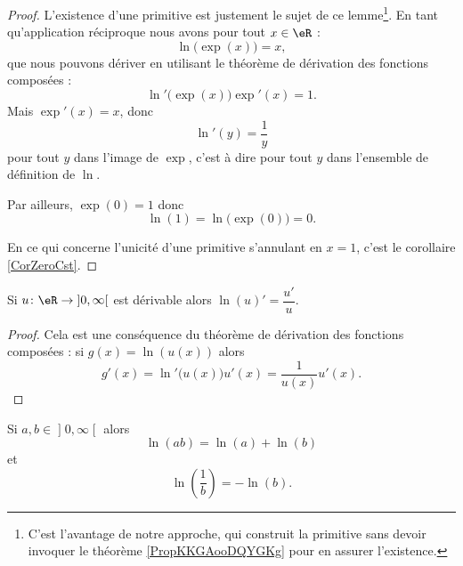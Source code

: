 \begin{proof}
    L'existence d'une primitive est justement le sujet de ce lemme\footnote{C'est l'avantage de notre approche, qui construit la primitive sans devoir invoquer le théorème \ref{PropKKGAooDQYGKg} pour en assurer l'existence.}. En tant qu'application réciproque nous avons pour tout \( x\in \eR\) :
    \begin{equation}
        \ln\big( \exp(x) \big)=x,
    \end{equation}
    que nous pouvons dériver en utilisant le théorème de dérivation des fonctions composées :
    \begin{equation}
        \ln'\big( \exp(x) \big)\exp'(x)=1.
    \end{equation}
    Mais \( \exp'(x)=x\), donc
    \begin{equation}
        \ln'(y)=\frac{1}{ y }
    \end{equation}
    pour tout \( y\) dans l'image de \( \exp\), c'est à dire pour tout \( y\) dans l'ensemble de définition de \( \ln\).

    Par ailleurs, \( \exp(0)=1\) donc
    \begin{equation}
        \ln(1)=\ln\big( \exp(0) \big)=0.
    \end{equation}

    En ce qui concerne l'unicité d'une primitive s'annulant en \( x=1\), c'est le corollaire \ref{CorZeroCst}.
\end{proof}

\begin{lemma}
Si \( u\colon \eR\to \mathopen] 0 , \infty \mathclose[\) est dérivable alors \( \ln(u)'=\dfrac{ u' }{ u }\).
\end{lemma}

\begin{proof}
    Cela est une conséquence du théorème de dérivation des fonctions composées : si \( g(x)=\ln(u(x))\) alors
    \begin{equation}
        g'(x)=\ln'\big( u(x) \big)u'(x)=\frac{1}{ u(x) }u'(x).
    \end{equation}
\end{proof}

\begin{lemma}   \label{LemPEYJooEZlueU}
Si \( a,b\in\mathopen] 0 , \infty \mathclose[\) alors
    \begin{equation}
        \ln(ab)=\ln(a)+\ln(b)
    \end{equation}
    et
    \begin{equation}    \label{EqOOZGooOWkGlA}
        \ln\left( \frac{1}{ b } \right)=-\ln(b).
    \end{equation}
\end{lemma}

